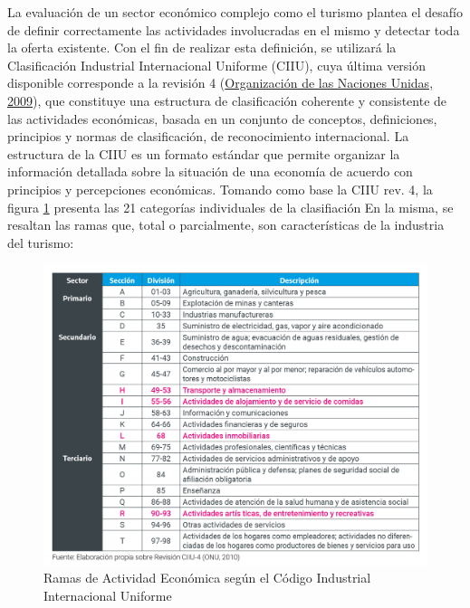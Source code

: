 \documentclass[
  openany]{book}
\begin{document}
La evaluación de un sector económico complejo como el turismo plantea el desafío de definir correctamente las actividades involucradas en el mismo y detectar toda la oferta existente. Con el fin de realizar esta definición, se utilizará la Clasificación Industrial Internacional Uniforme (CIIU), cuya última versión disponible corresponde a la revisión 4 (\protect\hyperlink{ref-ciiurev4}{Organización de las Naciones Unidas, 2009}), que constituye una estructura de clasificación coherente y consistente de las actividades económicas, basada en un conjunto de conceptos, definiciones, principios y normas de clasificación, de reconocimiento internacional. La estructura de la CIIU es un formato estándar que permite organizar la información detallada sobre la situación de una economía de acuerdo con principios y percepciones económicas. Tomando como base la CIIU rev. 4, la figura \ref{fig:ciiu} presenta las 21 categorías individuales de la clasifiación En la misma, se resaltan las ramas que, total o parcialmente, son características de la industria del turismo:

\begin{figure}

{\centering \includegraphics[width=1\linewidth]{imagenes/figura1.1} 

}

\caption{Ramas de Actividad Económica según el Código Industrial Internacional Uniforme}\label{fig:ciiu}
\end{figure}
\end{document}
